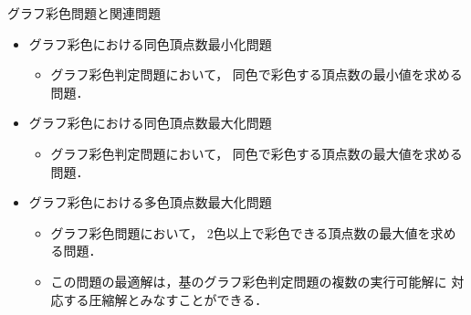 \documentclass[dvipdfmx,11pt]{beamer}
\begin{document}
\begin{frame}{グラフ彩色問題と関連問題}
 \begin{itemize}
  \item \alert{グラフ彩色における同色頂点数最小化問題}
        \begin{itemize}
         \item グラフ彩色判定問題において，
               同色で彩色する頂点数の最小値を求める問題．
        \end{itemize}
  \item \alert{グラフ彩色における同色頂点数最大化問題}
        \begin{itemize}
         \item グラフ彩色判定問題において，
               同色で彩色する頂点数の最大値を求める問題．
        \end{itemize}
  \item \alert{グラフ彩色における多色頂点数最大化問題}
        \begin{itemize}
         \item グラフ彩色問題において，
               2色以上で彩色できる頂点数の最大値を求める問題．
         \item この問題の最適解は，基のグラフ彩色判定問題の複数の実行可能解に
               対応する圧縮解とみなすことができる．
        \end{itemize}

 \end{itemize}
 
\end{frame}
\end{document}
